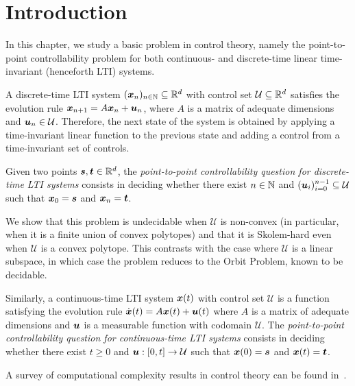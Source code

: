 \section{Introduction}
In this chapter, we study a basic problem in control theory, namely the point-to-point controllability problem for both continuous- and discrete-time linear time-invariant (henceforth LTI) systems.

A discrete-time LTI system $(\boldsymbol{x}_{n})_{n \in \mathbb{N}} \subseteq \mathbb{R}^{d}$ with control set $\mathcal{U} \subseteq \mathbb{R}^{d}$ satisfies the evolution rule $\boldsymbol{x}_{n+1} = A \boldsymbol{x}_{n} + \boldsymbol{u}_{n}$, where $A$ is a matrix of adequate dimensions and $\boldsymbol{u}_{n} \in \mathcal{U}$.
Therefore, the next state of the system is obtained by applying a time-invariant linear function to the previous state and adding a control from a time-invariant set of controls.

Given two points $\boldsymbol{s}, \boldsymbol{t} \in \mathbb{R}^{d}$, the \emph{point-to-point controllability question for discrete-time LTI systems} consists in deciding whether there exist $n \in \mathbb{N}$ and $(\boldsymbol{u}_{i})_{i=0}^{n-1} \subseteq \mathcal{U}$ such that $\boldsymbol{x}_{0} = \boldsymbol{s}$ and $\boldsymbol{x}_{n} = \boldsymbol{t}$.

We show that this problem is undecidable when $\mathcal{U}$ is non-convex (in particular, when it is a finite union of convex polytopes) and that it is Skolem-hard even when $\mathcal{U}$ is a convex polytope. This contrasts with the case where $\mathcal{U}$ is a linear subspace, in which case the problem reduces to the Orbit Problem, known to be decidable.

Similarly, a continuous-time LTI system $\boldsymbol{x}(t)$ with control set $\mathcal{U}$ is a function satisfying the evolution rule $\dot{\boldsymbol{x}}(t) = A \boldsymbol{x}(t) + \boldsymbol{u}(t)$
where $A$ is a matrix of adequate dimensions and $\boldsymbol{u}$ is a measurable function with codomain $\mathcal{U}$. The \emph{point-to-point controllability question for continuous-time LTI systems} consists in deciding whether there exist $t \geq 0$ and $\boldsymbol{u} : [0,t] \rightarrow \mathcal{U}$ such that $\boldsymbol{x}(0) = \boldsymbol{s}$ and $\boldsymbol{x}(t) = \boldsymbol{t}$.

A survey of computational complexity results in control theory can be found in~\cite{BlondelT00}.
